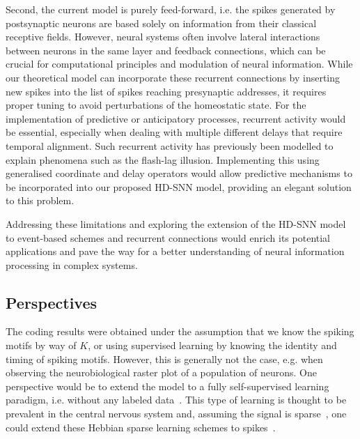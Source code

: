 \documentclass[runningheads]{llncs}
\newcommand{\kernel}{K} %
\begin{document}
Second, the current model is purely feed-forward, i.e. the spikes generated by postsynaptic neurons are based solely on information from their classical receptive fields. However, neural systems often involve lateral interactions between neurons in the same layer and feedback connections, which can be crucial for computational principles and modulation of neural information. While our theoretical model can incorporate these recurrent connections by inserting new spikes into the list of spikes reaching presynaptic addresses, it requires proper tuning to avoid perturbations of the homeostatic state. For the implementation of predictive or anticipatory processes, recurrent activity would be essential, especially when dealing with multiple different delays that require temporal alignment. Such recurrent activity has previously been modelled to explain phenomena such as the flash-lag illusion. Implementing this using generalised coordinate and delay operators would allow predictive mechanisms to be incorporated into our proposed HD-SNN model, providing an elegant solution to this problem.

Addressing these limitations and exploring the extension of the HD-SNN model to event-based schemes and recurrent connections would enrich its potential applications and pave the way for a better understanding of neural information processing in complex systems.
%
\subsection{Perspectives}
The coding results were obtained under the assumption that we know the spiking motifs by way of $\kernel$, or using supervised learning by knowing the identity and timing of spiking motifs. However, this is generally not the case, e.g. when observing the neurobiological raster plot of a population of neurons. One perspective would be to extend the model to a fully self-supervised learning paradigm, i.e. without any labeled data~\cite{barlow_unsupervised_1989}. This type of learning is thought to be prevalent in the central nervous system and, assuming the signal is sparse~\cite{olshausen_emergence_1996}, one could extend these Hebbian sparse learning schemes to spikes~\cite{perrinet_emergence_2004,masquelier_competitive_2009}. 
\end{document}
